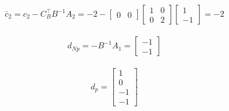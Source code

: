 \begin{align}
    \bar{c}_2 = c_2 - C_B^\top B^{-1} A_2 =
    -2 -
  \begin{bmatrix}
     0 & 0
  \end{bmatrix}
  \begin{bmatrix}
    1 & 0 \\ 0 & 2
  \end{bmatrix}
  \begin{bmatrix}
    1 \\ -1
  \end{bmatrix}
  = -2
\end{align}

\begin{align}
    d_{Np} = -B^{-1} A_1 = 
    \begin{bmatrix}
        -1 \\ -1
    \end{bmatrix}
\end{align}

\begin{align}
    d_p = 
    \begin{bmatrix}
        1 \\ 0 \\ -1 \\ -1
    \end{bmatrix}
\end{align}